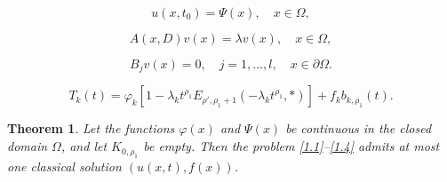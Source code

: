 \documentclass[10pt,a4paper]{amsart}
\newtheorem{theorem}{Theorem}
\begin{document}
\begin{equation}\label{1.4}
    u(x, t_0) = \Psi(x), \quad x \in \Omega,
\end{equation}

\begin{equation}\label{2.1}
    A(x, D)v(x) = \lambda v(x), \quad x \in \Omega,
\end{equation}

\begin{equation}\label{2.2}
    B_j v(x) = 0, \quad j = 1, \dots, l, \quad x \in \partial \Omega.
\end{equation}

\begin{equation}\label{5.5}
T_k(t) = \varphi_k \left[ 1 - \lambda_k t^{\rho_1} E_{ \rho', \rho_1 + 1} \left( -\lambda_k t^{\rho_1}, * \right) \right]
+ f_kb_{k,\rho_1}(t).
\end{equation}

\begin{theorem}
Let the functions $\varphi(x)$ and $\Psi(x)$ be continuous in the closed domain $\Omega$, and let $K_{0,\rho_1}$ be empty.
Then the problem \eqref{1.1}--\eqref{1.4} admits at most one classical solution $(u(x,t),f(x))$.
\end{theorem}
\end{document}
